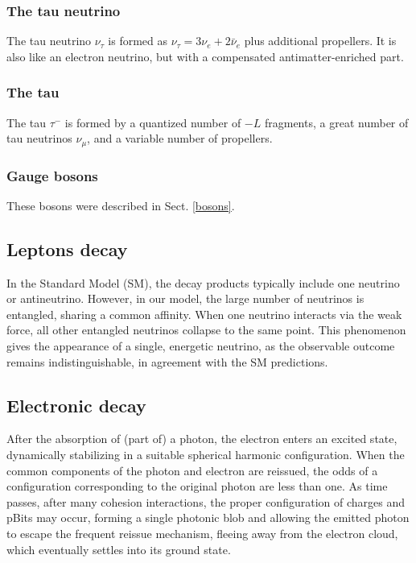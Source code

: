 \documentclass[12pt,english]{article}
\begin{document}
\subsubsection{The tau neutrino}
The tau neutrino $\nu_{\tau}$ is formed as $\nu_{\tau}=3\nu_e+2\bar{\nu}_e$ plus additional propellers. It is also like an electron neutrino, but with a compensated antimatter-enriched part.

\subsubsection{The tau}
The tau $\tau^-$ is formed by a quantized number of $-L$ fragments, a great number of tau neutrinos $\nu_{\mu}$, and a variable number of propellers.

\subsubsection{Gauge bosons}
These bosons were described in Sect. \ref{bosons}.

\subsection{Leptons decay}
In the Standard Model (SM), the decay products typically include one neutrino or antineutrino. However, in our model, the large number of neutrinos is entangled, sharing a common affinity. When one neutrino interacts via the weak force, all other entangled neutrinos collapse to the same point. This phenomenon gives the appearance of a single, energetic neutrino, as the observable outcome remains indistinguishable, in agreement with the SM predictions.

\subsection{Electronic decay}
After the absorption of (part of) a photon, the electron enters an excited state, dynamically stabilizing in a suitable spherical harmonic configuration. When the common components of the photon and electron are reissued, the odds of a configuration corresponding to the original photon are less than one. As time passes, after many cohesion interactions, the proper configuration of charges and pBits may occur, forming a single photonic blob and allowing the emitted photon to escape the frequent reissue mechanism, fleeing away from the electron cloud, which eventually settles into its ground state.
\end{document}
